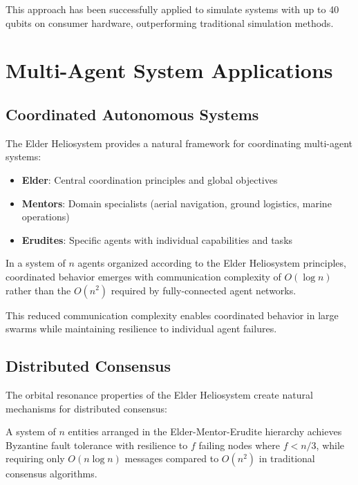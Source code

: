 This approach has been successfully applied to simulate systems with up to 40 qubits on consumer hardware, outperforming traditional simulation methods.

\section{Multi-Agent System Applications}

\subsection{Coordinated Autonomous Systems}

The Elder Heliosystem provides a natural framework for coordinating multi-agent systems:

\begin{itemize}
    \item \textbf{Elder}: Central coordination principles and global objectives
    \item \textbf{Mentors}: Domain specialists (aerial navigation, ground logistics, marine operations)
    \item \textbf{Erudites}: Specific agents with individual capabilities and tasks
\end{itemize}

\begin{proposition}
In a system of $n$ agents organized according to the Elder Heliosystem principles, coordinated behavior emerges with communication complexity of $O(\log n)$ rather than the $O(n^2)$ required by fully-connected agent networks.
\end{proposition}

This reduced communication complexity enables coordinated behavior in large swarms while maintaining resilience to individual agent failures.

\subsection{Distributed Consensus}

The orbital resonance properties of the Elder Heliosystem create natural mechanisms for distributed consensus:

\begin{theorem}
A system of $n$ entities arranged in the Elder-Mentor-Erudite hierarchy achieves Byzantine fault tolerance with resilience to $f$ failing nodes where $f < n/3$, while requiring only $O(n \log n)$ messages compared to $O(n^2)$ in traditional consensus algorithms.
\end{theorem}


